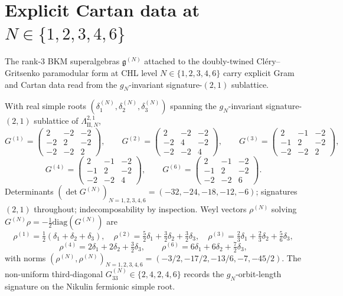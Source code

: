 \section{Explicit Cartan data at \texorpdfstring{$N \in \{1, 2, 3, 4, 6\}$}{N in 1, 2, 3, 4, 6}}
\label{sec:k3e-explicit-cartan-gN}

The rank-$3$ BKM superalgebras $\mathfrak{g}^{(N)}$ attached to the doubly-twined Cl\'ery--Gritsenko paramodular form at CHL level $N \in \{1, 2, 3, 4, 6\}$ carry explicit Gram and Cartan data read from the $g_N$-invariant signature-$(2, 1)$ sublattice.

\begin{conjecture}
\label{prop:k3e-explicit-cartan}
With real simple roots $(\delta_1^{(N)}, \delta_2^{(N)}, \delta_3^{(N)})$ spanning the $g_N$-invariant signature-$(2, 1)$ sublattice of $\Lambda^{2, 1}_{\mathrm{II}, N}$,
\[
G^{(1)} = \begin{pmatrix} 2 & -2 & -2 \\ -2 & 2 & -2 \\ -2 & -2 & 2 \end{pmatrix}, \qquad
G^{(2)} = \begin{pmatrix} 2 & -2 & -2 \\ -2 & 4 & -2 \\ -2 & -2 & 4 \end{pmatrix}, \qquad
G^{(3)} = \begin{pmatrix} 2 & -1 & -2 \\ -1 & 2 & -2 \\ -2 & -2 & 2 \end{pmatrix},
\]
\[
G^{(4)} = \begin{pmatrix} 2 & -1 & -2 \\ -1 & 2 & -2 \\ -2 & -2 & 4 \end{pmatrix}, \qquad
G^{(6)} = \begin{pmatrix} 2 & -1 & -2 \\ -1 & 2 & -2 \\ -2 & -2 & 6 \end{pmatrix}.
\]
Determinants $(\det G^{(N)})_{N = 1, 2, 3, 4, 6} = (-32, -24, -18, -12, -6)$; signatures $(2, 1)$ throughout; indecomposability by inspection. Weyl vectors $\rho^{(N)}$ solving $G^{(N)} \rho = -\tfrac{1}{2} \mathrm{diag}(G^{(N)})$ are
\[
\rho^{(1)} = \tfrac{1}{2}(\delta_1 + \delta_2 + \delta_3), \quad \rho^{(2)} = \tfrac{5}{2}\delta_1 + \tfrac{3}{2}\delta_2 + \tfrac{3}{2}\delta_3, \quad \rho^{(3)} = \tfrac{2}{3}\delta_1 + \tfrac{2}{3}\delta_2 + \tfrac{5}{6}\delta_3,
\]
\[
\rho^{(4)} = 2\delta_1 + 2\delta_2 + \tfrac{3}{2}\delta_3, \qquad \rho^{(6)} = 6\delta_1 + 6\delta_2 + \tfrac{7}{2}\delta_3,
\]
with norms $(\rho^{(N)}, \rho^{(N)})_{N = 1, 2, 3, 4, 6} = (-3/2, -17/2, -13/6, -7, -45/2)$. The non-uniform third-diagonal $G^{(N)}_{33} \in \{2, 4, 2, 4, 6\}$ records the $g_N$-orbit-length signature on the Nikulin fermionic simple root.
\end{conjecture}

